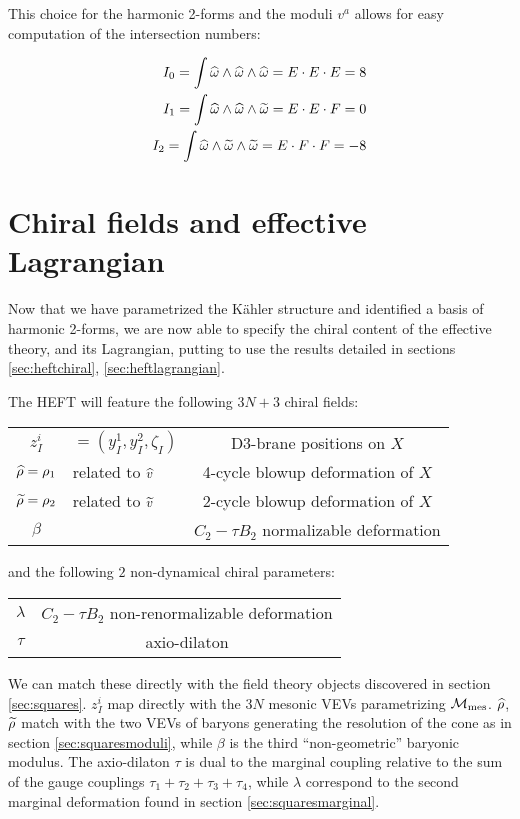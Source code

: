 This choice for the harmonic 2-forms and the moduli $v^a$ allows for easy computation of the intersection numbers:

\begin{align}
	I_0 = \int \widehat{\omega} \wedge \widehat{\omega} \wedge \widehat{\omega} = E \cdot E \cdot E  = 8 \\
	I_1 = \int \widehat{\omega} \wedge \widehat{\omega} \wedge \widetilde{\omega} = E \cdot E \cdot F  = 0\\
	I_2 = \int \widehat{\omega} \wedge \widetilde{\omega} \wedge \widetilde{\omega} = E \cdot F \cdot F = -8
	\label{}
\end{align}


\section{Chiral fields and effective Lagrangian}

Now that we have parametrized the K\"ahler structure and identified a basis of harmonic 2-forms, we are now able to specify the chiral content of the effective theory, and its Lagrangian, putting to use the results detailed in sections \ref{sec:heftchiral}, \ref{sec:heftlagrangian}.

The HEFT will feature the following $3N + 3$ chiral fields:

\begin{center}\begin{tabular}{c | l c}
	$z_I^i$ & $= (y_I^1, y_I^2, \zeta_I)$ & D3-brane positions on $X$\\
	$\widehat{\rho} = \rho_1$ & related to $\widehat{v}$ & 4-cycle blowup deformation of $X$\\
	$\widetilde{\rho} = \rho_2$ & related to $\widetilde{v}$ & 2-cycle blowup deformation of $X$\\
	$\beta$ &  & $C_2 - \tau B_2$ normalizable deformation
\end{tabular}\end{center}


and the following $2$ non-dynamical chiral parameters:

\begin{center}
\begin{tabular}{c | c}
	$\lambda$ &  $C_2 - \tau B_2$ non-renormalizable deformation\\
	$\tau$ &  axio-dilaton
\end{tabular}\end{center}

We can match these directly with the field theory objects discovered in section \ref{sec:squares}. $z_I^i$ map directly with the $3N$ mesonic VEVs parametrizing $\mathcal{M}_\mathrm{mes}$. $\widehat{\rho}$, $\widetilde{\rho}$ match with the two VEVs of baryons generating the resolution of the cone as in section \ref{sec:squaresmoduli}, while $\beta$ is the third ``non-geometric'' baryonic modulus. The axio-dilaton $\tau$ is dual to the marginal coupling relative to the sum of the gauge couplings $\tau_1 + \tau_2 + \tau_3 + \tau_4$, while $\lambda$ correspond to the second marginal deformation found in section \ref{sec:squaresmarginal}.

